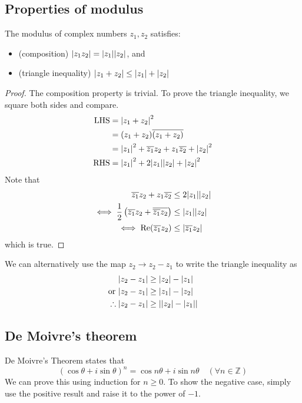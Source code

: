 \subsection{Properties of modulus}
The modulus of complex numbers \(z_1, z_2\) satisfies:
\begin{itemize}
	\item (composition) \(\abs{z_1 z_2} = \abs{z_1} \abs{z_2}\), and
	\item (triangle inequality) \(\abs{z_1 + z_2} \leq \abs{z_1} + \abs{z_2}\)
\end{itemize}
\begin{proof}
	The composition property is trivial.
	To prove the triangle inequality, we square both sides and compare.
	\begin{align*}
		\text{LHS} & = \abs{z_1 + z_2}^2                                                 \\
		           & = (z_1 + z_2)\overline{(z_1 + z_2)}                                 \\
		           & = \abs{z_1}^2 + \overline{z_1}z_2 + z_1\overline{z_2} + \abs{z_2}^2 \\
		\text{RHS} & = \abs{z_1}^2 + 2 \abs{z_1}\abs{z_2} + \abs{z_2}^2
	\end{align*}
	Note that
	\begin{align*}
		\overline{z_1}z_2 + z_1\overline{z_2}                                           & \leq 2 \abs{z_1}\abs{z_2}     \\
		\iff \frac{1}{2}\left( \overline{z_1}z_2 + \overline{\overline{z_1}z_2} \right) & \leq \abs{z_1}\abs{z_2}       \\
		\iff \Re (\overline{z_1} z_2)                                                   & \leq \abs{\overline{z_1} z_2}
	\end{align*}
	which is true.
\end{proof}

We can alternatively use the map \(z_2 \to z_2 - z_1\) to write the triangle inequality as
\begin{align*}
	\abs{z_2 - z_1}            & \geq \abs{z_2} - \abs{z_1}       \\
	\text{or } \abs{z_2 - z_1} & \geq \abs{z_1} - \abs{z_2}       \\
	\therefore \abs{z_2 - z_1} & \geq \abs{\abs{z_2} - \abs{z_1}} \\
\end{align*}

\subsection{De Moivre's theorem}
De Moivre's Theorem states that
\[
	(\cos \theta + i \sin \theta)^n = \cos n \theta + i \sin n \theta \quad(\forall n \in \mathbb Z)
\]
We can prove this using induction for \(n \geq 0\).
To show the negative case, simply use the positive result and raise it to the power of \(-1\).
